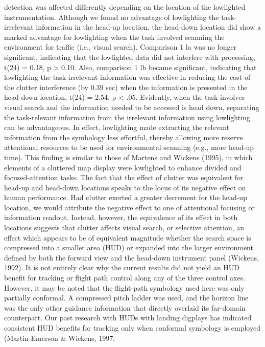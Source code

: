 \documentclass[utf8,bachelor,manualbib]{gradu3}
\begin{document}
detection was affected differently depending on the location of the lowlighted
instrumentation. Although we found no advantage of lowlighting the task-irrelevant
information in the head-up location, the head-down location did show a marked
advantage for lowlighting when the task involved scanning the environment for
traffic (i.e., visual search). Comparison 1 la was no longer significant, indicating
that the lowlighted data did not interfere with processing, t(24) = 0.18, p > 0.10.
Also, comparison 1 lb became significant, indicating that lowlighting the task-irrelevant
information was effective in reducing the cost of the clutter interference
(by 0.39 sec) when the information is presented in the head-down location, t(24) =
2.54, p < .05. Evidently, when the task involves visual search and the information
needed to be accessed is head down, separating the task-relevant information from
the irrelevant information using lowlighting can be advantageous. In effect,
lowlighting made extracting the relevant information from the symbology less
effortful, thereby allowing more reserve attentional resources to be used for
environmental scanning (e.g., more head-up time). This finding is similar to those
of Martens and Wickens (1995), in which elements of a cluttered map display were
lowlighted to enhance divided and focused-attention tasks.
The fact that the effect of clutter was equivalent for head-up and head-down
locations speaks to the locus of its negative effect on human performance. Had clutter exerted a greater decrement for the head-up location, we would attribute the
negative effect to one of attentional focusing or information readout. Instead,
however, the equivalence of its effect in both locations suggests that clutter affects
visual search, or selective attention, an effect which appears to be of equivalent
magnitude whether the search space is compressed into a smaller area (HUD) or
expanded into the larger environment defined by both the forward view and the
head-down instrument panel (Wickens, 1992).
It is not entirely clear why the current results did not yield an HUD benefit for
tracking or flight path control along any of the three control axes. However, it may
be noted that the flight-path symbology used here was only partially conformal. A
compressed pitch ladder was used, and the horizon line was the only other guidance
information that directly overlaid its far-domain counterpart. Our past research with
HUDs with landing digplays has indicated consistent HUD benefits for tracking
only when conformal symbology is employed (Martin-Emerson \& Wickens, 1997;
\end{document}
